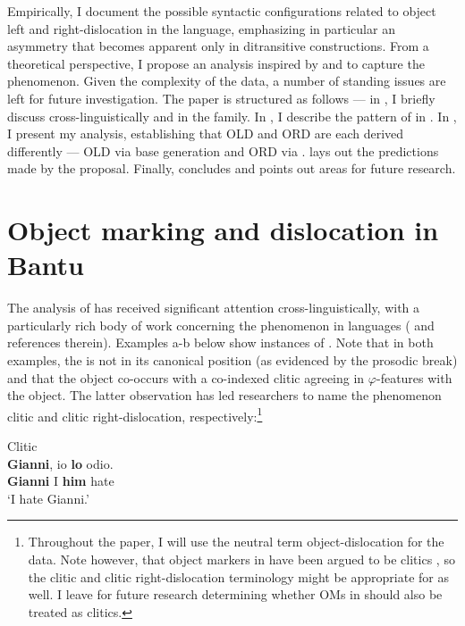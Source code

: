 \documentclass[output=paper
,newtxmath
,modfonts
,nonflat]{langsci/langscibook}
\begin{document}
Empirically, I document the possible syntactic configurations related to object left and right-dislocation in the language, emphasizing in particular an asymmetry that becomes apparent only in ditransitive constructions. From a theoretical perspective, I propose an analysis inspired by \citet{Cecchetto1999} and \citet{Zeller2015} to capture the phenomenon. Given the complexity of the data, a number of standing issues are left for future investigation. The paper is structured as follows — in , I briefly discuss  cross-linguistically and in the  family. In , I describe the pattern of  in . In , I present my analysis, establishing that OLD and ORD are each derived differently — OLD via base generation and ORD via .  lays out the predictions made by the proposal. Finally,  concludes and points out areas for future research.

\section{Object marking and dislocation in Bantu}\label{sec:ranero:2}

The analysis of  has received significant attention \newline cross-linguistically, with a particularly rich body of work concerning the phenomenon in  languages (\citealt{anagnostopouloutoappear} and references therein). Examples a-b below show instances of . Note that in both examples, the  is not in its canonical position (as evidenced by the prosodic break) and that the object co-occurs with a co-indexed clitic agreeing in $\varphi $-features with the object. The latter observation has led researchers to name the phenomenon clitic  and clitic right-dislocation, respectively:\footnote{Throughout the paper, I will use the neutral term object-dislocation for the  data. Note however, that object markers in  have been argued to be clitics \citep{diercks2015}, so the clitic  and clitic right-dislocation terminology might be appropriate for  as well. I leave for future research determining whether OMs in  should also be treated as clitics.}

\ea\label{ex:ranero:2}
 \citep{Cecchetto1999}
\ea\label{ex:ranero:2a} Clitic \\
\gll \textbf{Gianni}, io \textbf{lo}    odio. \\ 
\textbf{Gianni} I   \textbf{him} hate      \\
\glt ‘I hate Gianni.’ 
\end{document}
